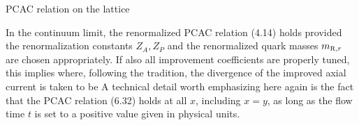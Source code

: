  PCAC relation on the lattice

In the continuum limit, the renormalized PCAC relation (4.14) holds 
provided the renormalization constants $Z_A,Z_P$ and the renormalized
quark masses $\mR{r}$ are chosen appropriately.
If also all improvement coefficients are properly tuned, this
implies
where, following the tradition, the divergence of the 
improved axial current is taken to be
A technical detail worth emphasizing here again is the fact that
the PCAC relation (6.32) holds at all $x$, including $x=y$, as long as 
the flow time $t$ is set to a positive value given in physical units.
